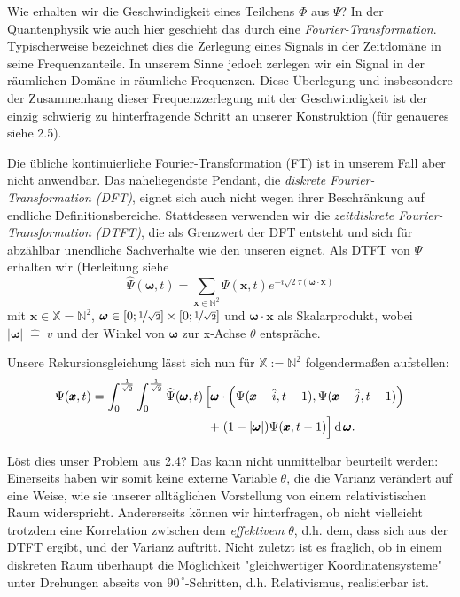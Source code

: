 \documentclass[a4paper,12pt,ngerman]{scrartcl}
\theoremstyle{plain}
\theoremstyle{plain}
\theoremstyle{plain}
\theoremstyle{plain}
\newcommand{\X}{\mathbb{X}}
\newcommand{\N}{\mathbb{N}}
\begin{document}
Wie erhalten wir die Geschwindigkeit eines Teilchens $\Phi$ aus $\Psi$? In der Quantenphysik wie auch hier geschieht das durch eine \textit{Fourier-Transformation}. Typischerweise bezeichnet dies die Zerlegung eines Signals in der Zeitdomäne in seine Frequenzanteile. In unserem Sinne jedoch zerlegen wir ein Signal in der räumlichen Domäne in \glqq räumliche Frequenzen\grqq. Diese Überlegung und insbesondere der Zusammenhang dieser Frequenzzerlegung mit der Geschwindigkeit ist der einzig schwierig zu hinterfragende Schritt an unserer Konstruktion (für genaueres siehe 2.5).

Die übliche kontinuierliche Fourier-Transformation (FT) ist in unserem Fall aber nicht anwendbar. Das naheliegendste Pendant, die \textit{diskrete Fourier-Transformation (DFT)}, eignet sich auch nicht wegen ihrer Beschränkung auf endliche Definitionsbereiche. Stattdessen verwenden wir die \textit{zeitdiskrete Fourier-Transformation (DTFT)}, die als Grenzwert der DFT entsteht und sich für abzählbar unendliche Sachverhalte wie den unseren eignet. Als DTFT von $\Psi$ erhalten wir (Herleitung siehe %
\[\widehat{\Psi}(\pmb{\omega},t) = \sum_{\pmb{x}\in\mathbb{N}^2}\Psi(\pmb{x},t)e^{-i\sqrt{2}\tau(\pmb{\omega}\cdot\pmb{x})}\]
mit $\pmb{x}\in\X=\N^2$,\; $\pmb{\omega}\in[0;\nicefrac{1}{\sqrt{2}}]\times[0;\nicefrac{1}{\sqrt{2}}]$ und $\pmb{\omega}\cdot\pmb{x}$ als Skalarprodukt, wobei $|\pmb{\omega}|\;\widehat{=}\;v$ und der Winkel von $\pmb{\omega}$ zur x-Achse $\theta$ entspräche.

Unsere Rekursionsgleichung lässt sich nun für $\X:=\N^2$ folgendermaßen aufstellen:
\begin{align*}
\Psi(\pmb{x},t) = \int_0^{\frac{1}{\sqrt2}}\int_0^{\frac{1}{\sqrt2}} 
\widehat{\Psi}(\pmb{\omega},t)
&\left[
\pmb{\omega}\cdot\left(\Psi(\pmb{x}-\hat{i},t-1),\Psi(\pmb{x}-\hat{j},t-1)\right)
\right.\\
&\left.\;+\;(1-|\pmb{\omega}|)\Psi(\pmb{x},t-1)\vphantom{\hat{\Psi}}\right]
\operatorname{d}\pmb{\omega}. 
\end{align*}

Löst dies unser Problem aus 2.4? Das kann nicht unmittelbar beurteilt werden: Einerseits haben wir somit keine externe Variable $\theta$, die die Varianz verändert auf eine Weise, wie sie unserer alltäglichen Vorstellung von einem relativistischen Raum widerspricht. Andererseits können wir hinterfragen, ob nicht vielleicht trotzdem eine Korrelation zwischen dem \textit{effektivem} $\theta$, d.h. dem, dass sich aus der DTFT ergibt, und der Varianz auftritt. Nicht zuletzt ist es fraglich, ob in einem diskreten Raum überhaupt die Möglichkeit "gleichwertiger Koordinatensysteme" unter Drehungen abseits von $90^{\,\circ}$-Schritten, d.h. Relativismus, realisierbar ist. 
\end{document}
